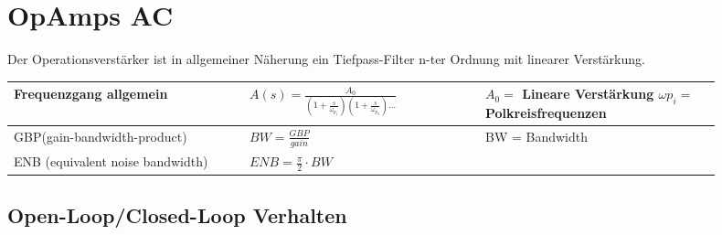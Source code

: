 \section{OpAmps AC}

Der Operationsverstärker ist in allgemeiner Näherung ein Tiefpass-Filter n-ter Ordnung mit linearer Verstärkung. \\
\renewcommand{\arraystretch}{1.2}
 \begin{tabular}{|p{0.3\linewidth}|p{0.3\linewidth}|p{0.3\linewidth}|}
 	\hline
 	Frequenzgang allgemein
 		& \large{$A(s) = \frac{A_{0}}{(1+\frac{s}{\omega_{p_1}})(1+\frac{s}{\omega_{p_2}})\dots}$}
 		& $A_{0}=$ Lineare Verstärkung \newline $\omega{p_i}=$ Polkreisfrequenzen \\
 	\hline
 	GBP(gain-bandwidth-product) & $BW = \frac{GBP}{gain}$ & BW = Bandwidth
 	\\ \hline
 	ENB (equivalent noise bandwidth) & $ENB = \frac{\pi}{2} \cdot BW$ \\ \hline
 \end{tabular}

\subsection{Open-Loop/Closed-Loop Verhalten}

